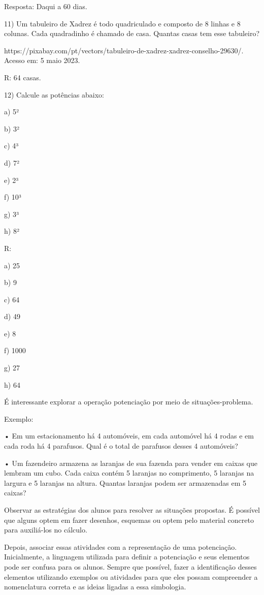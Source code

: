 Resposta: Daqui a 60 dias.

11) Um tabuleiro de Xadrez é todo quadriculado e composto de 8 linhas e
8 colunas. Cada quadradinho é chamado de casa. Quantas casas tem esse
tabuleiro?

https://pixabay.com/pt/vectors/tabuleiro-de-xadrez-xadrez-conselho-29630/.
Acesso em: 5 maio 2023.

R: 64 casas.

12) Calcule as potências abaixo:

a) 5²

b) 3²

c) 4³

d) 7²

e) 2³

f) 10³

g) 3³

h) 8²

R:

a) 25

b) 9

c) 64

d) 49

e) 8

f) 1000

g) 27

h) 64

É interessante explorar a operação potenciação por meio de
situações-problema.

Exemplo:

• Em um estacionamento há 4 automóveis, em cada automóvel há 4 rodas e
em cada roda há 4 parafusos. Qual é o total de parafusos desses 4
automóveis?

• Um fazendeiro armazena as laranjas de sua fazenda para vender em
caixas que lembram um cubo. Cada caixa contém 5 laranjas no comprimento,
5 laranjas na largura e 5 laranjas na altura. Quantas laranjas podem ser
armazenadas em 5 caixas?

Observar as estratégias dos alunos para resolver as situações propostas.
É possível que alguns optem em fazer desenhos, esquemas ou optem pelo
material concreto para auxiliá-los no cálculo.

Depois, associar essas atividades com a representação de uma
potenciação. Inicialmente, a linguagem utilizada para definir a
potenciação e seus elementos pode ser confusa para os alunos. Sempre que
possível, fazer a identificação desses elementos utilizando exemplos ou
atividades para que eles possam compreender a nomenclatura correta e as
ideias ligadas a essa simbologia.

